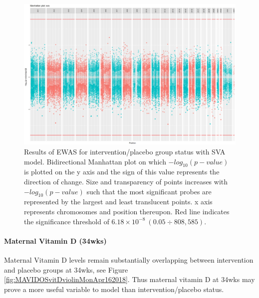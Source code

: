 \documentclass[
]{book}
\begin{document}
\begin{figure}

{\centering \includegraphics[width=0.8\linewidth]{figs/MAVIDOSccEPICewasManhattanSVA} 

}

\caption{Results of EWAS for intervention/placebo group status with SVA model. Bidirectional Manhattan plot on which \(-log_{10}(p-value)\) is plotted on the y axis and the sign of this value represents the direction of change. Size and transparency of points increases with \(-log_{10}(p-value)\) such that the most significant probes are represented by the largest and least translucent points. x axis represents chromosomes and position thereupon. Red line indicates the significance threshold of \(6.18\times10^{-8}~(0.05\div808,585)\).}\label{fig:MAVIDOSccEPICewasManhattanSVA}
\end{figure}



\hypertarget{maternal-vitamin-d-34wks}{%
\paragraph{Maternal Vitamin D (34wks)}\label{maternal-vitamin-d-34wks}}

Maternal Vitamin D levels remain substantially overlapping between intervention and placebo groups at 34wks, see Figure \ref{fig:MAVIDOSvitDviolinMonApr162018}.
Thus maternal vitamin D at 34wks may prove a more useful variable to model than intervention/placebo status.
\end{document}
